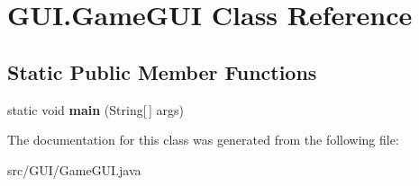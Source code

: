 \hypertarget{class_g_u_i_1_1_game_g_u_i}{}\section{G\+U\+I.\+Game\+G\+UI Class Reference}
\label{class_g_u_i_1_1_game_g_u_i}
\subsection*{Static Public Member Functions}
\begin{DoxyCompactItemize}
\item 
\mbox{\label{class_g_u_i_1_1_game_g_u_i_ac538a171ff001d8f4b2bca9c37e4a7f8}} 
static void {\bfseries main} (String\mbox{[}$\,$\mbox{]} args)
\end{DoxyCompactItemize}


The documentation for this class was generated from the following file\+:\begin{DoxyCompactItemize}
\item 
src/\+G\+U\+I/Game\+G\+U\+I.\+java\end{DoxyCompactItemize}
